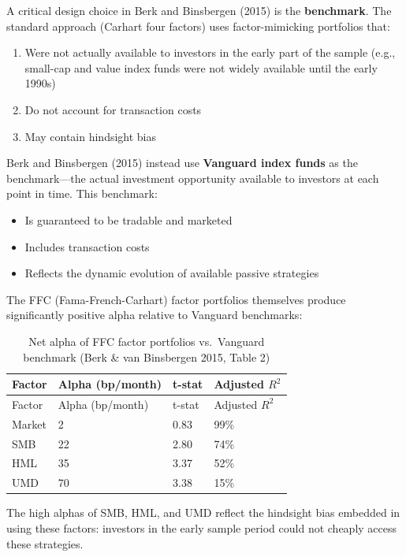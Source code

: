 \documentclass[
  letterpaper,
  DIV=11,
  numbers=noendperiod]{scrartcl}
\providecommand{\tightlist}{%
  \setlength{\itemsep}{0pt}\setlength{\parskip}{0pt}}
\begin{document}
A critical design choice in Berk and Binsbergen (2015) is the
\textbf{benchmark}. The standard approach (Carhart four factors) uses
factor-mimicking portfolios that:

\begin{enumerate}
\def\labelenumi{\arabic{enumi}.}
\tightlist
\item
  Were not actually available to investors in the early part of the
  sample (e.g., small-cap and value index funds were not widely
  available until the early 1990s)
\item
  Do not account for transaction costs
\item
  May contain hindsight bias
\end{enumerate}

Berk and Binsbergen (2015) instead use \textbf{Vanguard index funds} as
the benchmark---the actual investment opportunity available to investors
at each point in time. This benchmark:

\begin{itemize}
\tightlist
\item
  Is guaranteed to be tradable and marketed
\item
  Includes transaction costs
\item
  Reflects the dynamic evolution of available passive strategies
\end{itemize}

The FFC (Fama-French-Carhart) factor portfolios themselves produce
significantly positive alpha relative to Vanguard benchmarks:

\begin{longtable}[]{@{}llll@{}}
\caption{Net alpha of FFC factor portfolios vs.~Vanguard benchmark (Berk
\& van Binsbergen 2015, Table 2)}\tabularnewline
\toprule\noalign{}
Factor & Alpha (bp/month) & t-stat & Adjusted \(R^2\) \\
\midrule\noalign{}
\endfirsthead
\toprule\noalign{}
Factor & Alpha (bp/month) & t-stat & Adjusted \(R^2\) \\
\midrule\noalign{}
\endhead
\bottomrule\noalign{}
\endlastfoot
Market & 2 & 0.83 & 99\% \\
SMB & 22 & 2.80 & 74\% \\
HML & 35 & 3.37 & 52\% \\
UMD & 70 & 3.38 & 15\% \\
\end{longtable}

The high alphas of SMB, HML, and UMD reflect the hindsight bias embedded
in using these factors: investors in the early sample period could not
cheaply access these strategies.
\end{document}
